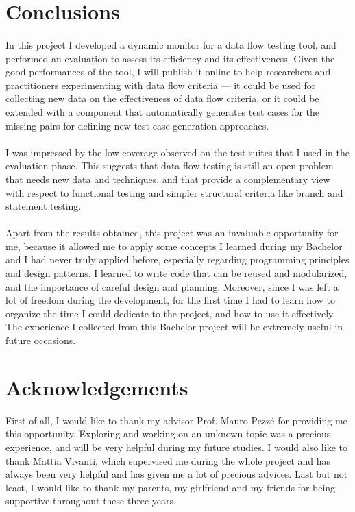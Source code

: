 \section{Conclusions}\label{conclusions}
\paragraph{}
In this project I developed a dynamic monitor for a data flow testing tool, and performed an evaluation to assess its efficiency and its effectiveness. Given the good performances of the tool, I will publish it online to help researchers and practitioners experimenting with data flow criteria --- it could be used for collecting new data on the effectiveness of data flow criteria, or it could be extended with a component that automatically generates test cases for the missing pairs for defining new test case generation approaches. 

\paragraph{}
I was impressed by the low coverage observed on the test suites that I used in the evaluation phase. This suggests that data flow testing is still an open problem that needs new data and techniques, and that provide a complementary view with respect to functional testing and simpler structural criteria like branch and statement testing. 

\paragraph{}
Apart from the results obtained, this project was an invaluable opportunity for me, because it allowed me to apply some concepts I learned during my Bachelor and I had never truly applied before, especially regarding programming principles and design patterns. I learned to write code that can be reused and modularized, and the importance of careful design and planning. Moreover, since I was left a lot of freedom during the development, for the first time I had to learn how to organize the time I could dedicate to the project, and how to use it effectively. The experience I collected from this Bachelor project will be extremely useful in future occasions.

\section{Acknowledgements}
First of all, I would like to thank my advisor Prof. Mauro Pezz\'e for providing me this opportunity. Exploring and working on an unknown topic was a precious experience, and will be very helpful during my future studies. I would also like to thank Mattia Vivanti, which supervised me during the whole project and has always been very helpful and has given me a lot of precious advices. Last but not least, I would like to thank my parents, my girlfriend and my friends for being supportive throughout these three years.


\newpage

